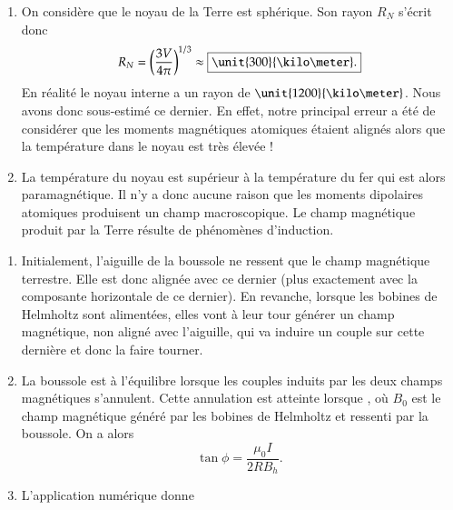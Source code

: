\begin{corrige}
\begin{enumerate}
   \item On considère que le noyau de la Terre est sphérique. Son rayon $R_N$ 
     s'écrit donc
     \begin{equation*}
	     R_N = \left(\dfrac{3V}{4\pi}\right)^{1/3} \approx 
	     \boxed{\unit{300}{\kilo \meter}.}
     \end{equation*}
     En réalité le noyau interne a un rayon de $\unit{1200}{\kilo \meter}$. Nous 
     avons donc sous-estimé ce dernier. En effet, notre principal erreur a été 
     de considérer que les moments magnétiques atomiques étaient alignés
     alors que la température dans le noyau est très élevée !
  \item La température du noyau est supérieur à la température du fer qui est alors
    paramagnétique. Il n'y a donc aucune raison que les moments dipolaires atomiques
    produisent un champ macroscopique. Le champ magnétique produit par la
    Terre résulte de phénomènes d'induction.
\end{enumerate}
\end{corrige}

\begin{corrige}
	\begin{enumerate}
		\item Initialement, l'aiguille de la boussole ne ressent que le
		  champ magnétique terrestre. Elle est donc alignée avec ce dernier
		  (plus exactement avec la composante horizontale de ce dernier).
		  En revanche, lorsque les bobines de Helmholtz sont alimentées,
		  elles vont à leur tour générer un champ magnétique, 
		  non aligné avec l'aiguille, qui va induire 
		  un couple sur cette dernière et donc la faire tourner.
		\item La boussole est à l'équilibre lorsque les couples induits
		  par les deux champs magnétiques s'annulent. Cette annulation
		  est atteinte lorsque , où
		  $B_0$ est le champ magnétique généré par les bobines de Helmholtz
		  et ressenti par la boussole. On a alors
		  \begin{equation*}
			  \boxed{\tan \phi = \dfrac{\mu_0 I}{2 R B_h}.}
		  \end{equation*}
	  \item L'application numérique donne 
\end{enumerate}
\end{corrige}

